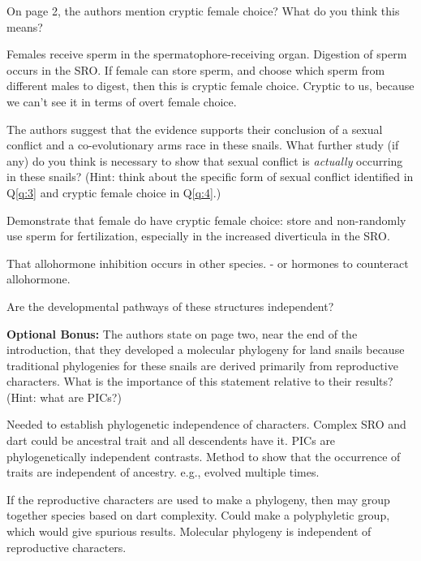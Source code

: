 \documentclass[11pt, addpoints]{exam}
\begin{document}
\begin{questions}
\question[5]
\label{q:4}On page 2, the authors mention cryptic female choice? What do you
  think this means?

\ifprintanswers\begin{solution}
Females receive sperm in the spermatophore-receiving organ.  Digestion of sperm occurs in the SRO.  If female can store sperm, and choose which sperm from different males to digest, then this is cryptic female choice.  Cryptic to us, because we can’t see it in terms of overt female choice.
\end{solution}
\else
\fi

\question[10]
The authors suggest that the evidence supports their conclusion of a
  sexual conflict and a co-evolutionary arms race in these snails. What
  further study (if any) do you think is necessary to show that sexual
  conflict is \emph{actually} occurring in these snails? (Hint: think about the
  specific form of sexual conflict identified in Q\ref{q:3}  and cryptic female
  choice in Q\ref{q:4}.)

\ifprintanswers\begin{solution}
Demonstrate that female do have cryptic female choice:  store and non-randomly use sperm for fertilization, especially in the increased diverticula in the SRO.

That allohormone inhibition occurs in other species. - or hormones to counteract allohormone.

Are the developmental pathways of these structures independent?
\end{solution}
\else{}
\fi

\question[2]
\textbf{Optional Bonus:} The authors state on page two, near the
end of the introduction, that they developed a molecular phylogeny for
land snails because traditional phylogenies for these snails are derived
primarily from reproductive characters. What is the importance of this
statement relative to their results? (Hint: what are PICs?)

\ifprintanswers\begin{solution}
Needed to establish phylogenetic independence of characters.  Complex SRO and dart could be ancestral trait and all descendents have it.  PICs are phylogenetically independent contrasts.  Method to show that the occurrence of traits are independent of ancestry.  e.g., evolved multiple times.

If the reproductive characters are used to make a phylogeny, then may group together species based on dart complexity.  Could make a polyphyletic group, which would give spurious results.  Molecular phylogeny is independent of reproductive characters.
\end{solution}
\else{}
\fi

\end{questions}
\end{document}
